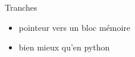 \begin{frame}[fragile]{Tranches}
\protect\hypertarget{tranches}{}
\begin{Shaded}
\begin{Highlighting}[]
\OperatorTok{=} \NormalTok{[}\OperatorTok{,}\OperatorTok{,}\OperatorTok{,}\OperatorTok{,}\NormalTok{]}\OperatorTok{;}
\OperatorTok{=} \OperatorTok{\&}\NormalTok{ v[}\NormalTok{]}\OperatorTok{;}
\NormalTok{s[}\NormalTok{] }\OperatorTok{=} \OperatorTok{;}
\OperatorTok{,} \NormalTok{[}\OperatorTok{,}\OperatorTok{,}\OperatorTok{,}\OperatorTok{,}\NormalTok{])}\OperatorTok{;}
\end{Highlighting}
\end{Shaded}

\begin{itemize}
\tightlist
\item
  pointeur vers un bloc mémoire
\item
  bien mieux qu'en python
\end{itemize}
\end{frame}

